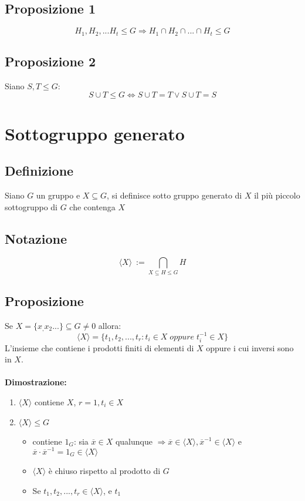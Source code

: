 \subsection{Proposizione 1}
\[H_1, H_2,...H_t\leq G\Rightarrow H_1\cap H_2\cap ...\cap H_t\leq G\]

\subsection{Proposizione 2}
Siano \(S, T\leq G\):
\[S\cup T\leq G \Leftrightarrow S\cup T = T \lor S\cup T= S\]

\section{Sottogruppo generato}

\subsection{Definizione}
Siano \(G\) un gruppo e \(X\subseteq G\), si definisce sotto gruppo generato di \(X\) il più piccolo sottogruppo di \(G\) che contenga \(X\)

\subsection{Notazione}
\[\langle X \rangle\ := \bigcap _{X\subseteq H\leq G} H\]

\subsection{Proposizione}
Se \(X=\{x_,x_2...\}\subseteq G \neq 0\) allora:
\[\langle X\rangle=\{t_1,t_2,...,t_r:t_i\in X\;oppure\; t_i^{-1}\in X\}\]
L'insieme che contiene i prodotti finiti di elementi di \(X\) oppure i cui inversi sono in \(X\).
\\
\\\textbf{Dimostrazione:}
\begin{enumerate}
	\item \(\langle X \rangle\) contiene \(X\), \(r=1, t_i\in X\)

	\item \(\langle X\rangle\leq G\) 

	\begin{itemize}

		\item contiene \(1_G\): sia \(\overline{x}\in X\) qualunque \(\Rightarrow\overline{x}\in\langle X\rangle ,\overline{x}^{-1}\in\langle X\rangle\) e \(\overline{x}\cdot\overline{x}^{-1}=1_G\in\langle X\rangle\)

		\item \(\langle X\rangle\) è chiuso rispetto al prodotto di \(G\)

		\item Se \(t_1,t_2,...,t_r\in\langle X\rangle\), e \(t_1\)

	\end{itemize}


\end{enumerate}

